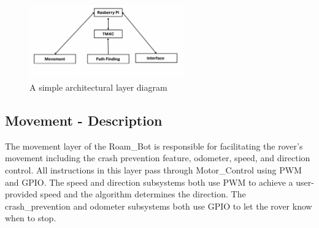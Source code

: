 
\begin{figure}[h!]
	\centering
 	\includegraphics[width=0.60\textwidth]{images/layers}
 \caption{A simple architectural layer diagram} %
\end{figure}

\subsection{Movement - Description}
The movement layer of the Roam\_Bot is responsible for facilitating the rover's movement including the crash prevention feature, odometer, speed, and direction control. All instructions in this layer pass through Motor\_Control using PWM and GPIO. The speed and direction subsystems both use PWM to achieve a user-provided speed and the algorithm determines the direction. The crash\_prevention and odometer subsystems both use GPIO to let the rover know when to stop.

